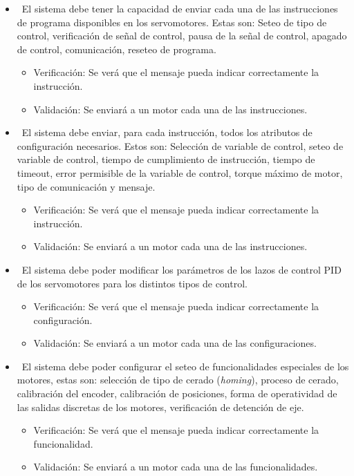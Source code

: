 \documentclass[
11pt, %
]{charter}
\begin{document}
\begin{itemize}
\begin{itemize}
	\end{itemize}
	\item \REQ ~El sistema debe tener la capacidad de enviar cada una de las instrucciones de programa disponibles en los servomotores. Estas son: Seteo de tipo de control, verificación de señal de control, pausa de la señal de control, apagado de control, comunicación, reseteo de programa.
	\begin{itemize}
		\item Verificación: Se verá que el mensaje pueda indicar correctamente la instrucción.
		\item Validación: Se enviará a un motor cada una de las instrucciones.
	\end{itemize}
	\item \REQ ~El sistema debe enviar, para cada instrucción, todos los atributos de configuración necesarios. Estos son: Selección de variable de control, seteo de variable de control, tiempo de cumplimiento de instrucción, tiempo de timeout, error permisible de la variable de control, torque máximo de motor, tipo de comunicación y mensaje.
	\begin{itemize}
		\item Verificación: Se verá que el mensaje pueda indicar correctamente la instrucción.
		\item Validación: Se enviará a un motor cada una de las instrucciones.
	\end{itemize}
	\item \REQ ~El sistema debe poder modificar los parámetros de los lazos de control PID de los servomotores para los distintos tipos de control.
	\begin{itemize}
		\item Verificación: Se verá que el mensaje pueda indicar correctamente la configuración.
		\item Validación: Se enviará a un motor cada una de las configuraciones.
	\end{itemize}
	\item \REQ ~El sistema debe poder configurar el seteo de funcionalidades especiales de los motores, estas son: selección de tipo de cerado (\textit{homing}), proceso de cerado, calibración del encoder, calibración de posiciones, forma de operatividad de las salidas discretas de los motores, verificación de detención de eje.
	\begin{itemize}
		\item Verificación: Se verá que el mensaje pueda indicar correctamente la funcionalidad.
		\item Validación: Se enviará a un motor cada una de las funcionalidades.

\end{itemize}
\end{itemize}
\end{document}
